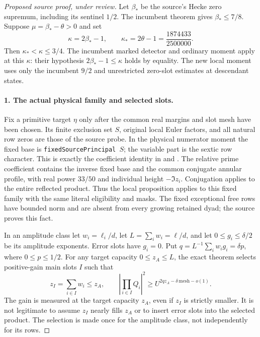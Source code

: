 \begin{proof}[Proposed source proof, under review]
Let $\beta_*$ be the source's Hecke zero supremum, including its sentinel
$1/2$. The incumbent theorem gives $\beta_*\le7/8$. Suppose
$\mu=\beta_*-\theta>0$ and set
\[
 \kappa=2\beta_*-1,\qquad
 \kappa_*=2\theta-1=\frac{1874433}{2500000}.
\]
Then $\kappa_*<\kappa\le3/4$. The incumbent marked detector and ordinary
moment apply at this $\kappa$: their hypothesis $2\beta_*-1\le\kappa$
holds by equality. The new local moment uses only the incumbent
$9/2$ and unrestricted zero-slot estimates at descendant states.

\paragraph{1. The actual physical family and selected slots.}
Fix a primitive target $\eta$ only after the common real margins and slot
mesh have been chosen. Its finite exclusion set $S$, original local
Euler factors, and all natural row zeros are those of the source probe.
In the physical numerator moment the fixed base is
\texttt{fixedSourcePrincipal $S$}; the variable part is the sextic row
character. This is exactly the coefficient identity in
 and
. The relative prime coefficient
contains the inverse fixed base and the common conjugate annular
profile, with real power $33/50$ and individual height $-\Im z_i$.
Conjugation applies to the entire reflected product. Thus the local
proposition applies to this fixed family with the same literal
eligibility and masks. The fixed exceptional free rows have bounded
norm and are absent from every growing retained dyad; the source
 proves this fact.

In an amplitude class let $w_i=\ell_i/d$, let
$L=\sum_iw_i=\ell/d$, and let $0\le g_i\le\delta/2$ be its amplitude
exponents. Error slots have $g_i=0$. Put
$q=L^{-1}\sum_iw_ig_i=\delta p$, where $0\le p\le1/2$.
For any target capacity $0\le z_A\le L$, the exact theorem
 selects positive-gain
main slots $I$ such that
\[
 z_I=\sum_{i\in I}w_i\le z_A,
 \qquad
 \left|\prod_{i\in I}Q_i\right|^2
 \ge U^{2qz_A-\delta\,\mathrm{mesh}-o(1)}.       \tag{EA.1}
\]
The gain is measured at the target capacity $z_A$, even if $z_I$ is
strictly smaller. It is not legitimate to assume $z_I$ nearly fills
$z_A$ or to insert error slots into the selected product. The selection
is made once for the amplitude class, not independently for its rows.


\end{proof}
